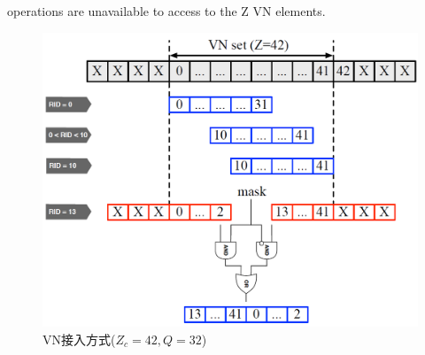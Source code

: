 \documentclass{article}
\begin{document}
operations are unavailable to access to the Z VN elements.\\
\begin{figure}[H]
	\centering
	\includegraphics[width = .8\textwidth]{vn.png}
	\caption{VN接入方式($Z_c=42,Q=32$)}
\end{figure}



\end{document}
